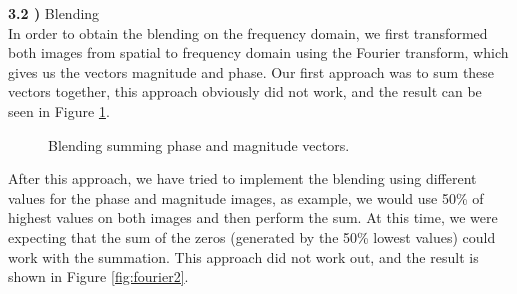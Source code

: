 \documentclass[12pt,a4paper]{article}
\begin{document}
\textbf{3.2 )} Blending \\

In order to obtain the blending on the frequency domain, we first transformed both images from spatial to frequency domain using the Fourier transform, which gives us the vectors magnitude and phase. Our first approach was to sum these vectors together, this approach obviously did not work, and the result can be seen in Figure \ref{fig:fourier1}. \\

\begin{figure}[!h]
	\centering
	{%
		\setlength{\fboxsep}{1pt}
		\setlength{\fboxrule}{1pt}
	}%
	\caption{Blending summing phase and magnitude vectors.}
	\label{fig:fourier1}
\end{figure}

After this approach, we have tried to implement the blending using different values for the phase and magnitude images, as example, we would use 50\% of highest values on both images and then perform the sum. At this time, we were expecting that the sum of the zeros (generated by the 50\% lowest values) could work with the summation. This approach did not work out, and the result is shown in Figure \ref{fig:fourier2}. \\
\end{document}

